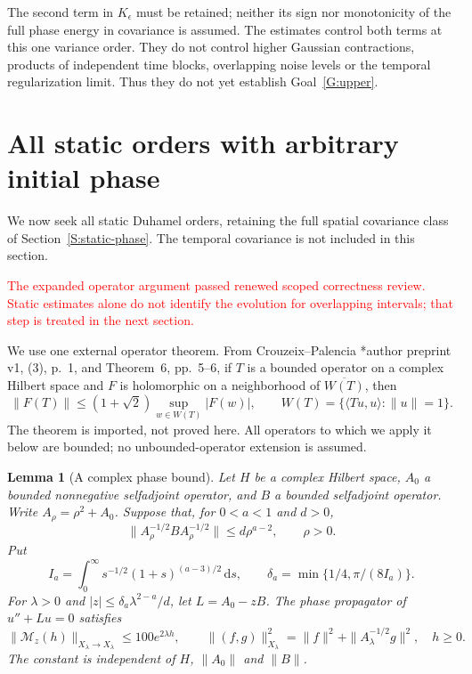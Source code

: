 \documentclass[12pt]{article}
\numberwithin{equation}{section}
\newtheorem{lemma}[theorem]{Lemma}
\theoremstyle{definition}
\newcommand{\ud}{\,\mathrm{d}}
\newcommand{\myCmts}[1]{\begin{framed}\noindent\textcolor{red}{#1}\end{framed}}
\begin{document}
The second term in $K_\epsilon$ must be retained; neither its sign nor
monotonicity of the full phase energy in covariance is assumed. The estimates
control both terms at this one variance order. They do not control higher
Gaussian contractions, products of independent time blocks, overlapping
noise levels or the temporal regularization limit. Thus they do not yet
establish Goal~\ref{G:upper}.

\section{All static orders with arbitrary initial phase}
\label{S:static-all-orders}

We now seek all static Duhamel orders, retaining the full spatial
covariance class of Section~\ref{S:static-phase}. The temporal
covariance is not included in this section.
\myCmts{The expanded operator argument passed renewed scoped correctness
review. Static estimates alone do not identify the evolution for
overlapping intervals; that step is treated in the next section.}

We use one external operator theorem. From Crouzeix--Palencia
\cite{crouzeix.palencia:source2017:numerical}*{author preprint v1,
(3), p.~1, and Theorem~6, pp.~5--6}, if $T$ is a bounded operator on a
complex Hilbert space and $F$ is holomorphic on a neighborhood of
$\overline{W(T)}$, then
\begin{equation}\label{E:cp-input}
  \|F(T)\|\le(1+\sqrt2)\sup_{w\in W(T)}|F(w)|,\qquad
  W(T)=\{\langle Tu,u\rangle:\|u\|=1\}.
\end{equation}
The theorem is imported, not proved here. All operators to which we
apply it below are bounded; no unbounded-operator extension is assumed.

\begin{lemma}[A complex phase bound]\label{L:complex-phase}
  Let $H$ be a complex Hilbert space, $A_0$ a bounded nonnegative
  selfadjoint operator, and $B$ a bounded selfadjoint operator.
  Write $A_\rho=\rho^2+A_0$. Suppose that, for $0<a<1$ and $d>0$,
  \begin{equation}\label{E:abstract-sandwich}
    \|A_\rho^{-1/2}BA_\rho^{-1/2}\|\le d\rho^{a-2},
    \qquad \rho>0.
  \end{equation}
  Put
  \[
    I_a=\int_0^\infty s^{-1/2}(1+s)^{(a-3)/2}\ud s,\qquad
    \delta_a=\min\{1/4,\pi/(8I_a)\}.
  \]
  For $\lambda>0$ and $|z|\le\delta_a\lambda^{2-a}/d$, let
  $L=A_0-zB$. The phase propagator of $u''+Lu=0$ satisfies
  \begin{equation}\label{E:complex-phase-bound}
    \|\mathcal M_z(h)\|_{X_\lambda\to X_\lambda}
    \le100e^{2\lambda h},\qquad
    \|(f,g)\|_{X_\lambda}^2
    =\|f\|^2+\|A_\lambda^{-1/2}g\|^2,\quad h\ge0.
  \end{equation}
  The constant is independent of $H$, $\|A_0\|$ and $\|B\|$.
\end{lemma}
\end{document}
